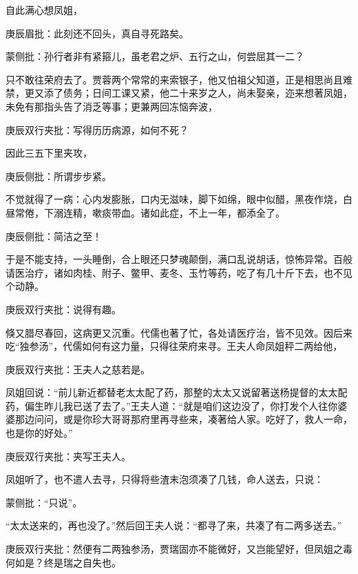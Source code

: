 \begin{parag}


    自此满心想凤姐，\begin{note}庚辰眉批：此刻还不回头，真自寻死路矣。\end{note}\begin{note}蒙侧批：孙行者非有紧箍儿，虽老君之炉、五行之山，何尝屈其一二？\end{note}只不敢往荣府去了。贾蓉两个常常的来索银子，他又怕祖父知道，正是相思尚且难禁，更又添了债务；日间工课又紧，他二十来岁之人，尚未娶亲，迩来想著凤姐，未免有那指头告了消乏等事；更兼两回冻恼奔波，\begin{note}庚辰双行夹批：写得历历病源，如何不死？\end{note}因此三五下里夹攻，\begin{note}庚辰侧批：所谓步步紧。\end{note}不觉就得了一病：心内发膨胀，口内无滋味，脚下如绵，眼中似醋，黑夜作烧，白昼常倦，下溺连精，嗽痰带血。诸如此症，不上一年，都添全了。\begin{note}庚辰侧批：简洁之至！\end{note}于是不能支持，一头睡倒，合上眼还只梦魂颠倒，满口乱说胡话，惊怖异常。百般请医治疗，诸如肉桂、附子、鳖甲、麦冬、玉竹等药，吃了有几十斤下去，也不见个动静。\begin{note}庚辰双行夹批：说得有趣。\end{note}
\end{parag}


\begin{parag}


    倏又腊尽春回，这病更又沉重。代儒也著了忙，各处请医疗治，皆不见效。因后来吃“独参汤”，代儒如何有这力量，只得往荣府来寻。王夫人命凤姐秤二两给他，\begin{note}庚辰双行夹批：王夫人之慈若是。\end{note}凤姐回说：“前儿新近都替老太太配了药，那整的太太又说留著送杨提督的太太配药，偏生昨儿我已送了去了。”王夫人道：“就是咱们这边没了，你打发个人往你婆婆那边问问，或是你珍大哥哥那府里再寻些来，凑著给人家。吃好了，救人一命，也是你的好处。”\begin{note}庚辰双行夹批：夹写王夫人。\end{note}凤姐听了，也不遣人去寻，只得将些渣末泡须凑了几钱，命人送去，只说：\begin{note}蒙侧批：“只说”。\end{note}“太太送来的，再也没了。”然后回王夫人说：“都寻了来，共凑了有二两多送去。”\begin{note}庚辰双行夹批：然便有二两独参汤，贾瑞固亦不能微好，又岂能望好，但凤姐之毒何如是？终是瑞之自失也。\end{note}
\end{parag}


